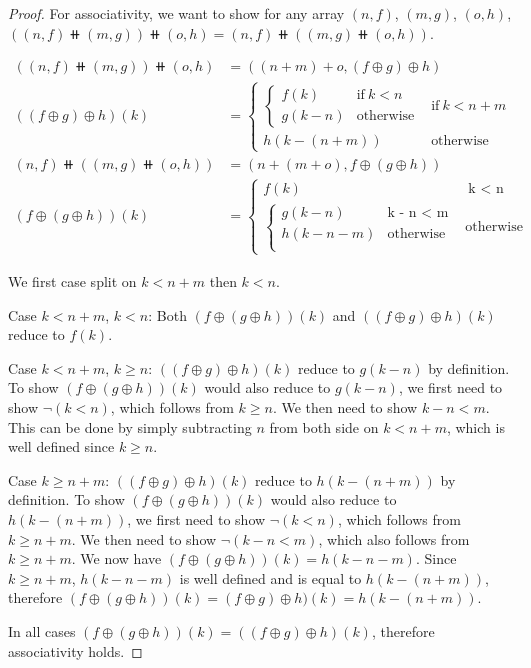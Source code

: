\begin{proof}
For associativity, we want to show for any array $(n, f)$, $(m, g)$, $(o, h)$,
$((n, f) \doubleplus (m, g)) \doubleplus (o, h) = (n, f) \doubleplus ((m, g) \doubleplus (o, h))$.

\begin{align*}
    ((n, f) \doubleplus (m, g)) \doubleplus (o, h) & = ((n + m) + o, (f \oplus g) \oplus h) \\
    ((f \oplus g) \oplus h)(k) & = \begin{cases}
        \begin{cases}
            f(k) & \text{if}\ k < n \\
            g(k - n) & \text{otherwise}
        \end{cases}
      & \text{if}\ k < n + m \\
      h(k - (n + m)) & \text{otherwise}
    \end{cases} \\
    (n, f) \doubleplus ((m, g) \doubleplus (o, h)) & = (n + (m + o), f \oplus (g \oplus h)) \\
    (f \oplus (g \oplus h))(k) & = \begin{cases}
        f(k) &\ \text{k < n} \\
        \begin{cases}
            g(k - n) & \text{k - n < m} \\
            h(k - n - m) & \text{otherwise} \\
        \end{cases} & \text{otherwise}
    \end{cases}
\end{align*} 

We first case split on $k < n + m$ then $k < n$.

Case $k < n + m$, $k < n$: Both $(f \oplus (g \oplus h))(k)$ and $((f \oplus g) \oplus h)(k)$ reduce to $f(k)$.

Case $k < n + m$, $k \geq n$: $((f \oplus g) \oplus h)(k)$ reduce to $g(k - n)$ by definition.
To show $(f \oplus (g \oplus h))(k)$ would also reduce to $g(k - n)$, we first need to show $\neg(k < n)$,
which follows from $k \geq n$. We then need to show $k - n < m$.
This can be done by simply subtracting $n$ from both side on $k < n + m$, which is well defined since $k \geq n$. 

Case $k \geq n + m$: $((f \oplus g) \oplus h)(k)$ reduce to $h(k - (n + m))$ by definition.
To show $(f \oplus (g \oplus h))(k)$ would also reduce to $h(k - (n + m))$,
we first need to show $\neg(k < n)$, which follows from $k \geq n + m$.
We then need to show $\neg(k - n < m)$, which also follows from $k \geq n + m$.
We now have $(f \oplus (g \oplus h))(k) = h(k - n - m)$. Since $k \geq n + m$, $h(k - n - m)$ is well defined
and is equal to $h(k - (n + m))$, therefore $(f \oplus (g \oplus h))(k) = (f \oplus g) \oplus h)(k) = h(k - (n + m))$.

In all cases $(f \oplus (g \oplus h))(k) = ((f \oplus g) \oplus h)(k)$, therefore associativity holds.
\end{proof}

